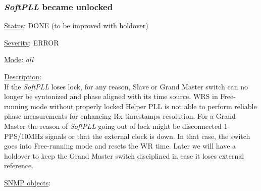 \subsubsection{\bf \emph{SoftPLL} became unlocked}
		\label{fail:timing:spll_unlock}
		\begin{pck_descr}
      \item [] \underline{Status}: DONE (to be improved with holdover)
			\item [] \underline{Severity}: ERROR
			\item [] \underline{Mode}: \emph{all}
			\item [] \underline{Description}:\\
				If the \emph{SoftPLL} loses lock, for any reason, Slave or Grand Master
				switch can no longer be syntonized and phase aligned with its time
				source. WRS in Free-running mode without properly locked Helper PLL is
				not able to perform reliable phase measurements for enhancing Rx
				timestamps resolution. For a Grand Master the reason of \emph{SoftPLL}
				going out of lock might be disconnected 1-PPS/10MHz signals or that the
        external clock is down. In that case, the switch goes into Free-running
        mode and resets the WR time. Later we will have a holdover to keep the
        Grand Master switch disciplined in case it loses external reference.
			\item [] \underline{SNMP objects}:\\
        {\footnotesize
				\\
				\\
				\\
				\\
				\\
				\\
				\\
				 \\
         }
		\end{pck_descr}

